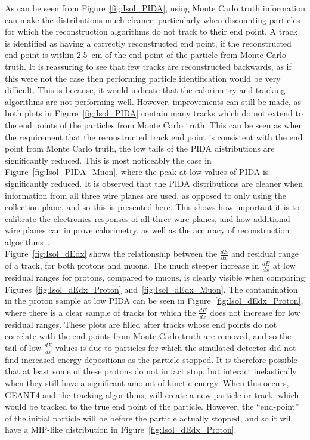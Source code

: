 As can be seen from Figure~\ref{fig:Isol_PIDA}, using Monte Carlo truth information can make the distributions much cleaner, particularly when discounting particles for which the reconstruction algorithms do not track to their end point. A track is identified as having a correctly reconstructed end point, if the reconstructed end point is within 2.5~cm of the end point of the particle from Monte Carlo truth. It is reassuring to see that few tracks are reconstructed backwards, as if this were not the case then performing particle identification would be very difficult. This is because, it would indicate that the calorimetry and tracking algorithms are not performing well. However, improvements can still be made, as both plots in Figure~\ref{fig:Isol_PIDA} contain many tracks which do not extend to the end points of the particles from Monte Carlo truth. This can be seen as when the requirement that the reconstructed track end point is consistent with the end point from Monte Carlo truth, the low tails of the PIDA distributions are significantly reduced. This is most noticeably the case in Figure~\ref{fig:Isol_PIDA_Muon}, where the peak at low values of PIDA is significantly reduced. It is observed that the PIDA distributions are cleaner when information from all three wire planes are used, as opposed to only using the collection plane, and so this is presented here. This shows how important it is to calibrate the electronics responses of all three wire planes, and how additional wire planes can improve calorimetry, as well as the accuracy of reconstruction algorithms~\citep{XinSeptFNAL}. \\

Figure~\ref{fig:Isol_dEdx} shows the relationship between the $\frac{dE}{dx}$ and residual range of a track, for both protons and muons. The much steeper increase in $\frac{dE}{dx}$ at low residual ranges for protons, compared to muons, is clearly visible when comparing Figures~\ref{fig:Isol_dEdx_Proton} and~\ref{fig:Isol_dEdx_Muon}. The contamination in the proton sample at low PIDA can be seen in Figure~\ref{fig:Isol_dEdx_Proton}, where there is a clear sample of tracks for which the $\frac{dE}{dx}$ does not increase for low residual ranges. These plots are filled after tracks whose end points do not correlate with the end points from Monte Carlo truth are removed, and so the tail of low $\frac{dE}{dx}$ values is due to particles for which the simulated detector did not find increased energy depositions as the particle stopped. It is therefore possible that at least some of these protons do not in fact stop, but interact inelastically when they still have a significant amount of kinetic energy. When this occurs, GEANT4 and the tracking algorithms, will create a new particle or track, which would be tracked to the true end point of the particle. However, the ``end-point'' of the initial particle will be before the particle actually stopped, and so it will have a MIP-like distribution in Figure~\ref{fig:Isol_dEdx_Proton}. \\


